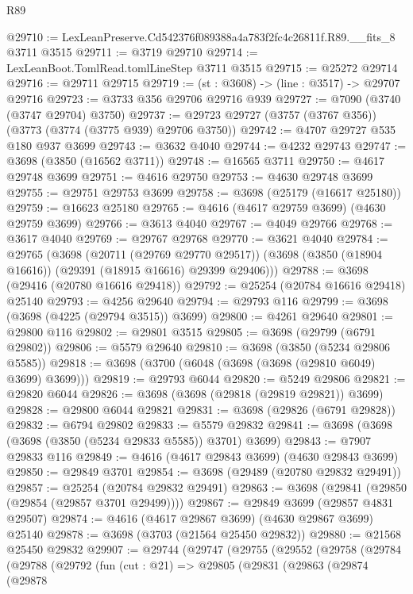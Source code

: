\begin{lexlean}{R89}
\begin{coremodule}
@29710 := LexLeanPreserve.Cd542376f089388a4a783f2fc4c26811f.R89.__fits_8 @3711 @3515
@29711 := @3719 @29710
@29714 := LexLeanBoot.TomlRead.tomlLineStep @3711 @3515
@29715 := @25272 @29714
@29716 := @29711 @29715
@29719 := (st : @3608) -> (line : @3517) -> @29707 @29716
@29723 := @3733 @356 @29706 @29716 @939
@29727 := @7090 (@3740 (@3747 @29704) @3750)
@29737 := @29723 @29727 (@3757 (@3767 @356)) (@3773 (@3774 (@3775 @939) @29706 @3750))
@29742 := @4707 @29727 @535 @180 @937 @3699
@29743 := @3632 @4040
@29744 := @4232 @29743
@29747 := @3698 (@3850 (@16562 @3711))
@29748 := @16565 @3711
@29750 := @4617 @29748 @3699
@29751 := @4616 @29750
@29753 := @4630 @29748 @3699
@29755 := @29751 @29753 @3699
@29758 := @3698 (@25179 (@16617 @25180))
@29759 := @16623 @25180
@29765 := @4616 (@4617 @29759 @3699) (@4630 @29759 @3699)
@29766 := @3613 @4040
@29767 := @4049 @29766
@29768 := @3617 @4040
@29769 := @29767 @29768
@29770 := @3621 @4040
@29784 := @29765
    (@3698
      (@20711 (@29769 @29770 @29517))
      (@3698 (@3850 (@18904 @16616)) (@29391 (@18915 @16616) @29399 @29406)))
@29788 := @3698 (@29416 (@20780 @16616 @29418))
@29792 := @25254 (@20784 @16616 @29418) @25140
@29793 := @4256 @29640
@29794 := @29793 @116
@29799 := @3698 (@3698 (@4225 (@29794 @3515)) @3699)
@29800 := @4261 @29640
@29801 := @29800 @116
@29802 := @29801 @3515
@29805 := @3698 (@29799 (@6791 @29802))
@29806 := @5579 @29640
@29810 := @3698 (@3850 (@5234 @29806 @5585))
@29818 := @3698 (@3700 (@6048 (@3698 (@3698 (@29810 @6049) @3699) @3699)))
@29819 := @29793 @6044
@29820 := @5249 @29806
@29821 := @29820 @6044
@29826 := @3698 (@3698 (@29818 (@29819 @29821)) @3699)
@29828 := @29800 @6044 @29821
@29831 := @3698 (@29826 (@6791 @29828))
@29832 := @6794 @29802
@29833 := @5579 @29832
@29841 := @3698 (@3698 (@3698 (@3850 (@5234 @29833 @5585)) @3701) @3699)
@29843 := @7907 @29833 @116
@29849 := @4616 (@4617 @29843 @3699) (@4630 @29843 @3699)
@29850 := @29849 @3701
@29854 := @3698 (@29489 (@20780 @29832 @29491))
@29857 := @25254 (@20784 @29832 @29491)
@29863 := @3698 (@29841 (@29850 (@29854 (@29857 @3701 @29499))))
@29867 := @29849 @3699 (@29857 @4831 @29507)
@29874 := @4616 (@4617 @29867 @3699) (@4630 @29867 @3699) @25140
@29878 := @3698 (@3703 (@21564 @25450 @29832))
@29880 := @21568 @25450 @29832
@29907 := @29744
    (@29747
      (@29755
        (@29552
          (@29758
            (@29784
              (@29788
                (@29792
                  (fun (cut : @21) =>
                  @29805
                    (@29831
                      (@29863
                        (@29874
                          (@29878

\end{coremodule}
\end{lexlean}
